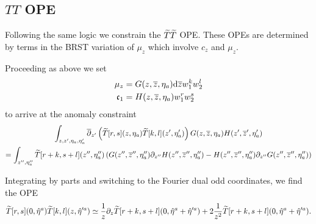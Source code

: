 \documentclass[../main.tex]{subfiles}
\begin{document}
\subsection{$TT$ OPE}
\label{sec:TT1}

Following the same logic we constrain the $\widetilde{T}\widetilde{T}$ OPE. 
These OPEs are determined by terms in the BRST variation of $\mu_z$ which involve $c_z$ and $\mu_z$. 

Proceeding as above we set
\begin{align*}
\mu_z & = G(z,{\overline{z}},\eta_a) \mathrm{d} {\overline{z}} w_1^k w_2^l \\
\mathfrak{c}_1 & = H(z,{\overline{z}},\eta_a) w_1^r w_2^s
\end{align*}
to arrive at the anomaly constraint
\begin{multline}
\int_{z,z',\eta_a,\eta_a'} \overline{\partial}_{z'} \left(\widetilde{T}[r,s](z,\eta_a) \widetilde{T}[k,l](z',\eta_a') \right) G(z,{\overline{z}},\eta_a) H(z',{\overline{z}}',\eta_a') \\
= \int_{z'',\eta''_a} \widetilde{T} [r+k, s+l]  (z'', \eta_a'') \left(G(z'',{\overline{z}}'', \eta_a'') \partial_{z''} H(z'', {\overline{z}}'', \eta_a'') - H(z'', {\overline{z}}'', \eta_a'') \partial_{z''} G(z'',{\overline{z}}'', \eta_a'') \right) 
\end{multline}

Integrating by parts and switching to the Fourier dual odd coordinates, we find the OPE 
\begin{equation}\label{ope:TT}
\widetilde{T}[r,s] (0,\Hat\eta^a) \widetilde{T}[k,l] (z, \Hat\eta'^a) \simeq \frac1z \partial_z \widetilde{T}[r+k, s+l]  (0,\Hat\eta^a + \Hat\eta'^a) + 2 \frac{1}{z^2} \widetilde{T}[r+k, s+l]  (0,\Hat\eta^a + \Hat\eta'^a) .
\end{equation}

\subsubsection{}
\end{document}
